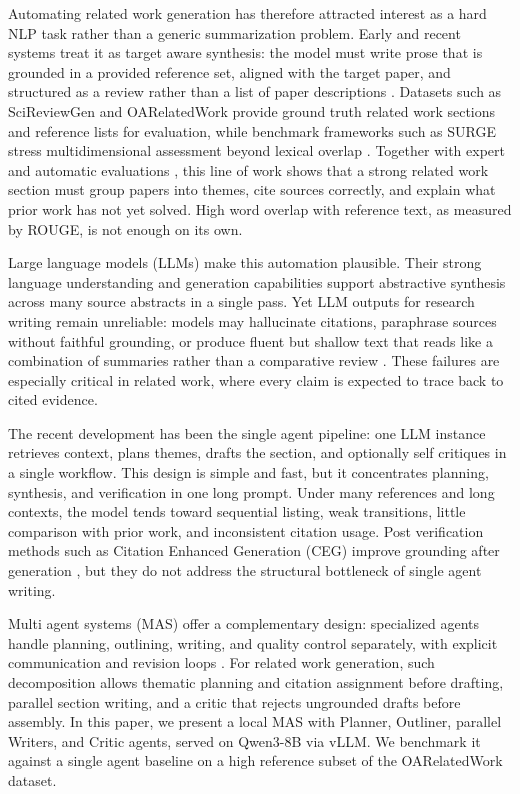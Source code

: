 \documentclass[conference]{IEEEtran}
\begin{document}
Automating related work generation has therefore attracted interest as a hard NLP task rather than a generic summarization problem. Early and recent systems treat it as target aware synthesis: the model must write prose that is grounded in a provided reference set, aligned with the target paper, and structured as a review rather than a list of paper descriptions \cite{chen2022tag,scireviewgen2023,surge2025}. Datasets such as SciReviewGen and OARelatedWork provide ground truth related work sections and reference lists for evaluation, while benchmark frameworks such as SURGE stress multidimensional assessment beyond lexical overlap \cite{surge2025,scireviewgen2023}. Together with expert and automatic evaluations \cite{expertEvalRW2025,sahinuc2024citationtext}, this line of work shows that a strong related work section must group papers into themes, cite sources correctly, and explain what prior work has not yet solved. High word overlap with reference text, as measured by ROUGE, is not enough on its own.

Large language models (LLMs) make this automation plausible. Their strong language understanding and generation capabilities support abstractive synthesis across many source abstracts in a single pass. Yet LLM outputs for research writing remain unreliable: models may hallucinate citations, paraphrase sources without faithful grounding, or produce fluent but shallow text that reads like a combination of summaries rather than a comparative review \cite{expertEvalRW2025,li2024ceg}. These failures are especially critical in related work, where every claim is expected to trace back to cited evidence.

The recent development has been the single agent pipeline: one LLM instance retrieves context, plans themes, drafts the section, and optionally self critiques in a single workflow. This design is simple and fast, but it concentrates planning, synthesis, and verification in one long prompt. Under many references and long contexts, the model tends toward sequential listing, weak transitions, little comparison with prior work, and inconsistent citation usage. Post verification methods such as Citation Enhanced Generation (CEG) improve grounding after generation \cite{li2024ceg}, but they do not address the structural bottleneck of single agent writing.

Multi agent systems (MAS) offer a complementary design: specialized agents handle planning, outlining, writing, and quality control separately, with explicit communication and revision loops \cite{lira2025,agentLaboratory2025,li2024masSurvey}. For related work generation, such decomposition allows thematic planning and citation assignment before drafting, parallel section writing, and a critic that rejects ungrounded drafts before assembly. In this paper, we present a local MAS with Planner, Outliner, parallel Writers, and Critic agents, served on Qwen3-8B via vLLM. We benchmark it against a single agent baseline on a high reference subset of the OARelatedWork dataset.
\end{document}
